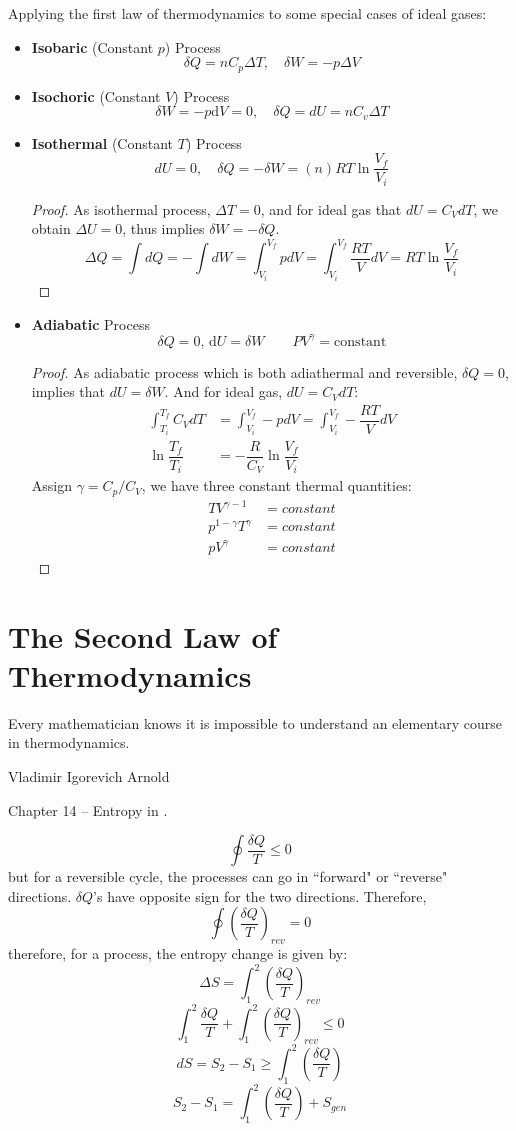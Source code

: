 \documentclass[UTF8]{book}
\newenvironment{theorem}[2][Theorem]{\begin{trivlist}
\item[\hskip \labelsep {\bfseries #1}\hskip \labelsep {\bfseries }]}{\end{trivlist}}
\begin{document}
{Applying the first law of thermodynamics to some special cases 
of ideal gases:}
\begin{itemize}
\item  {\textbf{Isobaric} (Constant $p$) Process}
$$\delta Q=nC_p\Delta T, \quad \delta W=-p\Delta V $$
\item  {\textbf{Isochoric} (Constant $V$) Process}
$$\delta W=-p \mathrm{d}V=0, \quad \delta Q=dU=nC_v\Delta T$$
\item  {\textbf{Isothermal} (Constant $T$) Process}
$$dU=0,\quad \delta Q=-\delta W=(n)RT\ln \dfrac{V_f}{V_i}$$
\begin{proof}
{As isothermal process, $\Delta T=0$, and for ideal gas that $dU=C_VdT$, we obtain $\Delta U=0$, thus implies $\delta W=-\delta Q$.}
$$\Delta Q = \int dQ =-\int dW=\int_{V_i}^{V_f}p d V=\int_{V_i}^{V_f}\dfrac{RT}{V}dV=RT\ln \dfrac{V_f}{V_i}$$
\end{proof}
\item  {\textbf{Adiabatic} Process}
$$\delta Q=0, \,  \mathrm{d} U= \delta W  \qquad PV^{\gamma}=\mathrm{constant}$$
\begin{proof}
{As adiabatic process which is both adiathermal and reversible, $\delta Q=0$, implies that $dU=\delta W$. And for ideal gas, $dU=C_VdT$:}
\begin{align*}
\int_{T_i}^{T_f}C_VdT&=\int_{V_i}^{V_f}-pdV=\int_{V_i}^{V_f}-\dfrac{RT}{V}dV\\
\ln \dfrac{T_f}{T_i}&=-\dfrac{R}{C_V}\ln \dfrac{V_f}{V_i}
\end{align*}
 {Assign $\gamma=C_p/C_V$, we have three constant thermal quantities:}
\begin{align*}
TV^{\gamma -1}&= {constant}\\
p^{1-\gamma}T^{\gamma}&= {constant}\\
pV^{\gamma}&= {constant}
\end{align*}
\end{proof}
\end{itemize}

\section{The Second Law of Thermodynamics}
\epigraph{Every mathematician knows it is impossible to understand an elementary course in thermodynamics.}{Vladimir Igorevich Arnold}
Chapter 14 -- Entropy in \cite{blundell2009concepts}.

\begin{theorem}[Clausius Inequality]
{For all thermodynamic cycles, reversible or irreversible, the Clausius inequality is valid:}
$$\oint \dfrac{\delta Q}{T}\leq 0$$
 {but for a reversible cycle, the processes can go in ``forward" or ``reverse" directions. $\delta Q$'s have opposite sign for the two directions. Therefore,}
$$\oint \left(\dfrac{\delta Q}{T}\right)_{rev}=0$$
 {therefore, for a process, the entropy change is given by: }
$$\Delta S=\int_{1}^{2}\left(\dfrac{\delta Q}{T}\right)_{rev}$$
$$\int_{1}^{2}\dfrac{\delta Q}{T}+\int_{1}^{2}\left(\dfrac{\delta Q}{T}\right)_{rev}\leq 0$$
$$dS=S_2-S_1\geq \int_{1}^{2}\left(\dfrac{\delta Q}{T}\right)$$
$$S_2-S_1=\int_{1}^{2}\left(\dfrac{\delta Q}{T}\right)+S_{gen}$$
\end{theorem}
\end{document}

